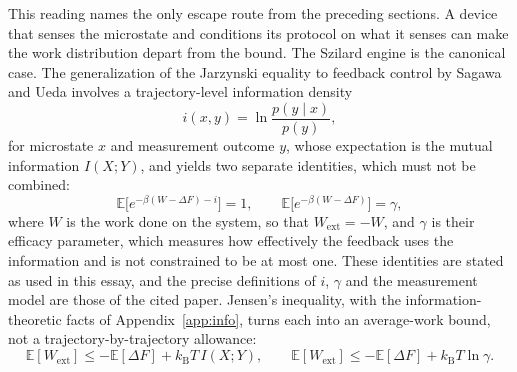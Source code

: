 \documentclass[11pt]{article}
\theoremstyle{definition}
\theoremstyle{remark}
\newcommand{\E}{\mathbb{E}}
\newcommand{\kB}{k_{\mathrm B}}
\begin{document}
This reading names the only escape route from the preceding sections. A device that senses the microstate and conditions its protocol on what it senses can make the work distribution depart from the bound. The Szilard engine \cite{szilard1929} is the canonical case. The generalization of the Jarzynski equality to feedback control by Sagawa and Ueda \cite{sagawa2010} involves a trajectory-level information density
\[
i(x,y) = \ln \frac{p(y \mid x)}{p(y)},
\]
for microstate $x$ and measurement outcome $y$, whose expectation is the mutual information $I(X;Y)$, and yields two separate identities, which must not be combined:
\[
\E\big[e^{-\beta (W - \Delta F) - i}\big] = 1,
\qquad
\E\big[e^{-\beta (W - \Delta F)}\big] = \gamma ,
\]
where $W$ is the work done on the system, so that $W_{\mathrm{ext}} = -W$, and $\gamma$ is their efficacy parameter, which measures how effectively the feedback uses the information and is not constrained to be at most one. These identities are stated as used in this essay, and the precise definitions of $i$, $\gamma$ and the measurement model are those of the cited paper. Jensen's inequality, with the information-theoretic facts of Appendix~\ref{app:info}, turns each into an average-work bound, not a trajectory-by-trajectory allowance:
\[
\E[W_{\mathrm{ext}}] \le -\E[\Delta F] + \kB T\, I(X;Y),
\qquad
\E[W_{\mathrm{ext}}] \le -\E[\Delta F] + \kB T \ln \gamma .
\]
\end{document}
